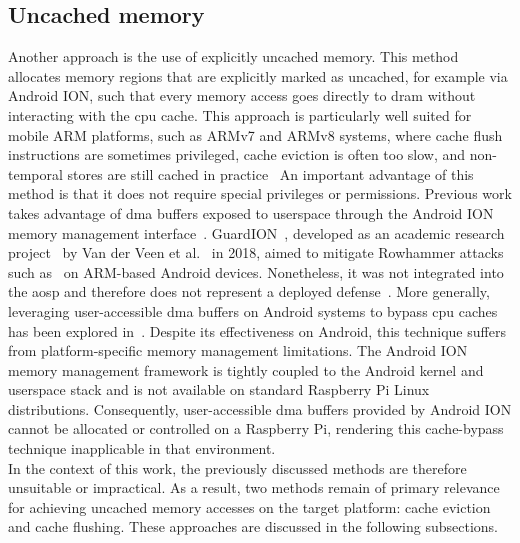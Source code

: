     \subsection{Uncached memory} \label{subsec:uncached-memory}
        Another approach is the use of explicitly uncached memory. This method allocates memory regions that 
        are explicitly marked as uncached, for example via Android ION, such that every memory access goes directly 
        to \gls{dram} without interacting with the \gls{cpu} cache. This approach is particularly well suited for mobile 
        ARM platforms, such as ARMv7 and ARMv8 systems, where cache flush instructions are sometimes privileged, 
        cache eviction is often too slow, and non-temporal stores are still cached in practice~\cite{paperDrammer, paperTriggeringRHHardwareFault, datasheetARMReferenceManual, toolRowhammering} An 
        important advantage of this method is that it does not require special privileges or permissions. 
        Previous work takes advantage of \gls{dma} buffers exposed to userspace through the Android ION memory 
        management interface~\cite{paperDrammer}. 
        GuardION~\cite{paperGuardION}, developed as an academic research project~\cite{toolGuardion} by Van der 
        Veen et al.~\cite{paperGuardION} in 2018, aimed to mitigate Rowhammer attacks such as~\cite{paperDrammer, toolDrammer} on 
        ARM-based Android devices. Nonetheless, it was not integrated into the \gls{aosp} and therefore does not 
        represent a deployed defense~\cite{toolGuardion}.
        More generally, leveraging user-accessible \gls{dma} buffers on Android systems to 
        bypass \gls{cpu} caches has been explored in~\cite{paperDrammer,paperTriggeringRHHardwareFault}. Despite its effectiveness on 
        Android, this technique suffers from platform-specific memory management limitations. The Android 
        ION memory management framework is tightly coupled to the Android kernel and userspace stack and is 
        not available on standard Raspberry Pi Linux distributions. Consequently, user-accessible \gls{dma} buffers 
        provided by Android ION cannot be allocated or controlled on a Raspberry Pi, rendering this cache-bypass 
        technique inapplicable in that environment.
        \\
        In the context of this work, the previously discussed methods are therefore unsuitable or impractical. 
        As a result, two methods remain of primary relevance for achieving uncached memory accesses on the 
        target platform: cache eviction and cache flushing. These approaches are discussed in the following 
        subsections.
    
    

    
